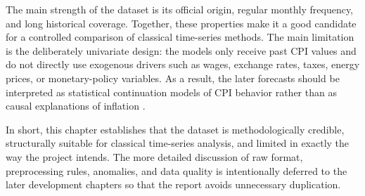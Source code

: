 The main strength of the dataset is its official origin, regular monthly frequency, and long historical coverage. Together, these properties make it a good candidate for a controlled comparison of classical time-series methods. The main limitation is the deliberately univariate design: the models only receive past CPI values and do not directly use exogenous drivers such as wages, exchange rates, taxes, energy prices, or monetary-policy variables. As a result, the later forecasts should be interpreted as statistical continuation models of CPI behavior rather than as causal explanations of inflation \cite{StockWatson1999}.

In short, this chapter establishes that the dataset is methodologically credible, structurally suitable for classical time-series analysis, and limited in exactly the way the project intends. The more detailed discussion of raw format, preprocessing rules, anomalies, and data quality is intentionally deferred to the later development chapters so that the report avoids unnecessary duplication.
